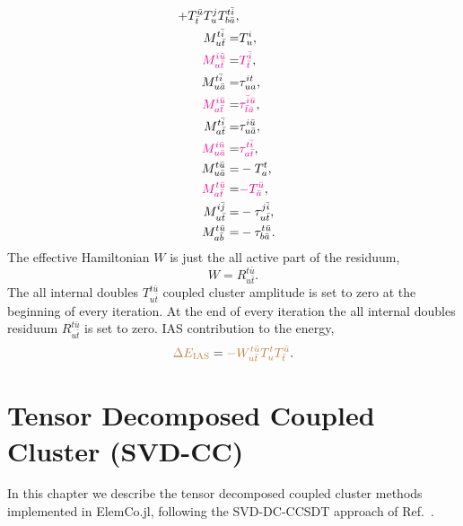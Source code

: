 \documentclass[a4paper,12pt,oneside]{book}
\newcommand{\magenta}[1]{{\color{magenta} #1}}
\newcommand{\brown}[1]{{\color{brown} #1}}
\newcommand{\spa}[1]{{#1}}
\newcommand{\spb}[1]{\bar{#1}}
\newcommand{\elemcoil}{\textsf{ElemCo.jl}}
\begin{document}
\begin{align}
{                                                      +T^{\spb{u}}_{\spb{t}} T^{\spa{j}}_{\spa{u}} T^{\spa{t}\spb{i}}_{\spa{b}\spb{a}}},\\
M^{\spa{t}\spb{i}}_{\spa{u}\spb{t}} = &T^{\spa{i}}_{\spa{u}},\\
\magenta{M^{\spa{i}\spb{u}}_{\spa{u}\spb{t}}} = &\magenta{T^{\spb{i}}_{\spb{t}}}, \\
M^{\spa{t}\spb{i}}_{\spa{u}\spb{a}} = &\tau^{\spa{i}\spa{t}}_{\spa{u}\spa{a}}, \\
\magenta{M^{\spa{i}\spb{u}}_{\spa{a}\spb{t}}} = &\magenta{\tau^{\spb{i}\spb{u}}_{\spb{t}\spb{a}}}, \\
M^{\spa{t}\spb{i}}_{\spa{a}\spb{t}} = &\tau^{\spa{i}\spb{u}}_{\spa{u}\spb{a}}, \\
\magenta{M^{\spa{i}\spb{u}}_{\spa{u}\spb{a}}} = &\magenta{\tau^{\spa{t}\spb{i}}_{\spa{a}\spb{t}}},\\
M^{\spa{t}\spb{u}}_{\spa{u}\spb{a}} = &-T^{\spa{t}}_{\spa{a}},\\
\magenta{M^{\spa{t}\spb{u}}_{\spa{a}\spb{t}}} = &\magenta{-T^{\spb{u}}_{\spb{a}}},\\
M^{\spa{i}\spb{j}}_{\spa{u}\spb{t}} = &-\tau^{\spa{j}\spb{i}}_{\spa{u}\spb{t}}, \\
M^{\spa{t}\spb{u}}_{\spa{a}\spb{b}} = &-\tau^{\spa{t}\spb{u}}_{\spa{b}\spb{a}}.
\end{align}
The effective Hamiltonian $W$ is just the all active part of the residuum,
\begin{equation}
W = R^{\spa{t}\spb{u}}_{\spa{u}\spb{t}}.
\end{equation}
The all internal doubles $T^{\spa{t}\spb{u}}_{\spa{u}\spb{t}}$ coupled cluster amplitude 
is set to zero at the beginning of every iteration.
At the end of every iteration the all internal doubles residuum $R^{\spa{t}\spb{u}}_{\spa{u}\spb{t}}$ is set to zero. \newline
IAS contribution to the energy,
\begin{equation}
\brown{\Delta E_{\mathrm{IAS}}} = \brown{-W^{\spa{t}\spb{u}}_{\spa{u}\spb{t}} T^{\spa{t}}_{\spa{u}} T^{\spb{u}}_{\spb{t}}}.
\end{equation}

\chapter{Tensor Decomposed Coupled Cluster (SVD-CC)}
\label{ch:svdcc}

In this chapter we describe the tensor decomposed coupled cluster methods 
implemented in \elemcoil, following the SVD-DC-CCSDT approach of 
Ref.~\cite{rickert_svd_dc_ccsdt}.
\end{document}

